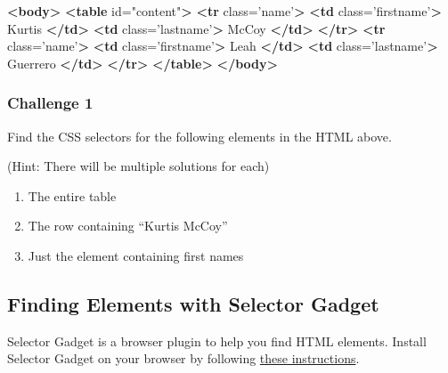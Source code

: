 \documentclass[]{book}
\newenvironment{Shaded}{\begin{snugshade}}{\end{snugshade}}
\newcommand{\KeywordTok}[1]{\textcolor[rgb]{0.13,0.29,0.53}{\textbf{#1}}}
\newcommand{\NormalTok}[1]{#1}
\newcommand{\OtherTok}[1]{\textcolor[rgb]{0.56,0.35,0.01}{#1}}
\newcommand{\StringTok}[1]{\textcolor[rgb]{0.31,0.60,0.02}{#1}}
\providecommand{\tightlist}{%
  \setlength{\itemsep}{0pt}\setlength{\parskip}{0pt}}
\begin{document}
\begin{Shaded}
\begin{Highlighting}[]
\KeywordTok{<body>}
    \KeywordTok{<table}\OtherTok{ id=}\StringTok{"content"}\KeywordTok{>}
        \KeywordTok{<tr}\OtherTok{ class=}\StringTok{'name'}\KeywordTok{>}
            \KeywordTok{<td}\OtherTok{ class=}\StringTok{'firstname'}\KeywordTok{>}
\NormalTok{                Kurtis}
            \KeywordTok{</td>}
            \KeywordTok{<td}\OtherTok{ class=}\StringTok{'lastname'}\KeywordTok{>}
\NormalTok{                McCoy}
            \KeywordTok{</td>}
        \KeywordTok{</tr>}
        \KeywordTok{<tr}\OtherTok{ class=}\StringTok{'name'}\KeywordTok{>}
            \KeywordTok{<td}\OtherTok{ class=}\StringTok{'firstname'}\KeywordTok{>}
\NormalTok{                Leah}
            \KeywordTok{</td>}
            \KeywordTok{<td}\OtherTok{ class=}\StringTok{'lastname'}\KeywordTok{>}
\NormalTok{                Guerrero}
            \KeywordTok{</td>}
        \KeywordTok{</tr>}
    \KeywordTok{</table>}
\KeywordTok{</body>}
\end{Highlighting}
\end{Shaded}

\hypertarget{challenge-1-2}{%
\subsubsection*{Challenge 1}\label{challenge-1-2}}

Find the CSS selectors for the following elements in the HTML above.

(Hint: There will be multiple solutions for each)

\begin{enumerate}
\def\labelenumi{\arabic{enumi}.}
\tightlist
\item
  The entire table
\item
  The row containing ``Kurtis McCoy''
\item
  Just the element containing first names
\end{enumerate}

\hypertarget{finding-elements-with-selector-gadget}{%
\subsection{Finding Elements with Selector Gadget}\label{finding-elements-with-selector-gadget}}

Selector Gadget is a browser plugin to help you find HTML elements. Install Selector Gadget on your browser by following \href{https://selectorgadget.com/}{these instructions}.
\end{document}
